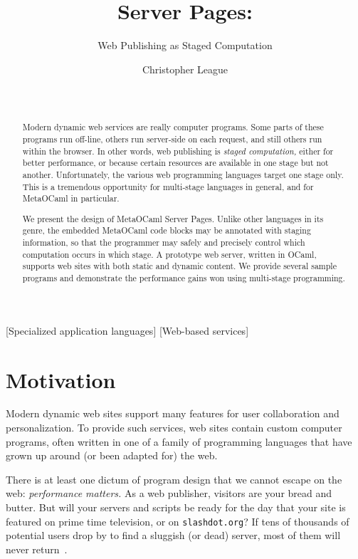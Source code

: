 \documentclass[preprint]{acm_proc_article-sp}
\title{\MOC Server Pages:}
\subtitle{Web Publishing as Staged Computation}
\author{
  \alignauthor Christopher League\\
  \affaddr{Long Island University · Computer Science}\\
  \affaddr{1 University Plaza · Brooklyn, NY 11201}\\
  \email{christopher.league@liu.edu}}
\def\MOC{MetaOCaml\xspace}
\begin{document}
\maketitle
\begin{abstract}
  Modern dynamic web services are really computer programs.
  Some parts of these programs run off-line, others run
  server-side on each request, and still others run within
  the browser.  In other words, web publishing is
  \emph{staged computation,} either for better performance,
  or because certain resources are available in one stage
  but not another.  Unfortunately, the various web
  programming languages target one stage only.  This is a
  tremendous opportunity for multi-stage languages in
  general, and for \MOC in particular.
  
  We present the design of \MOC Server Pages.  Unlike
  other languages in its genre, the embedded \MOC code
  blocks may be annotated with staging information, so that
  the programmer may safely and precisely control which
  computation occurs in which stage.  A prototype web
  server, written in OCaml, supports web sites with both
  static and dynamic content.  We provide several sample
  programs and demonstrate the performance gains won using
  multi-stage programming.
\end{abstract}
[Specialized application languages]
[Web-based services]

\section{Motivation}
\label{sec:intro}

Modern dynamic web sites support many features for user collaboration
and personalization.  To provide such services, web sites contain
custom computer programs, often written in one of a family of
programming languages that have grown up around (or been adapted for)
the web.

There is at least one dictum of program design that we cannot escape
on the web: \emph{performance matters.}  As a web publisher, visitors
are your bread and butter.  But will your servers and scripts be ready
for the day that your site is featured on prime time television, or on
\texttt{slashdot.org}?  If tens of thousands of potential users drop
by to find a sluggish (or dead) server, most of them will never
return~\cite{greenspun99panda}.
\end{document}
